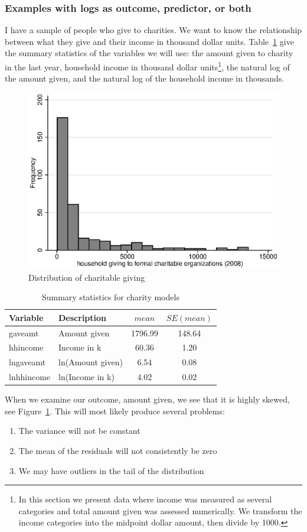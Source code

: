 \subsubsection{Examples with logs as outcome, predictor, or both}
\label{sec:midpointref}
I have a sample of people who give to charities. We want to know the relationship between what they give and their income in thousand dollar units. Table~\ref{tab:charitydes} give the summary statistics of the variables we will use: the amount given to charity in the last year, household income in thousand dollar units\footnote{In this section we present data where income was measured as several categories and total amount given was assessed numerically. We transform the income categories into the midpoint dollar amount, then divide by 1000.}, the natural log of the amount given, and the natural log of the household income in thousands.
\begin{figure}
   \centering
   \includegraphics[angle=0,
           width=.75\textwidth]{gave.eps}
   \caption{Distribution of charitable giving}
  \label{fig:gave}
\end{figure}
\begin{table}[htbp]
\caption{\label{tab:charitydes} Summary statistics for charity models}\centering\medskip
\begin{tabular}{llcc}\hline
Variable & Description & $mean$ & $SE\left(mean\right)$  \\ \hline
gaveamt & Amount given & 1796.99 & 148.64 \\
hhincome & Income in k & 60.36 & 1.20 \\
lngaveamt & ln(Amount given) & 6.54 & 0.08 \\
lnhhincome & ln(Income in k) & 4.02 & 0.02 \\ \hline
 \end{tabular}
\end{table}
When we examine our outcome, amount given, we see that it is highly skewed, see Figure~\ref{fig:gave}. This will most likely produce several problems:
\begin{enumerate}
\item The variance will not be constant
\item The mean of the residuals will not consistently be zero
\item We may have outliers in the tail of the distribution
\end{enumerate}


